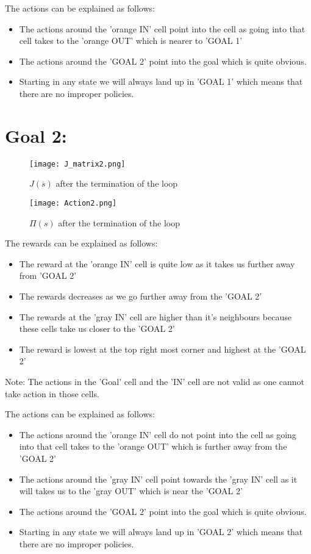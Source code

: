 \documentclass{article}
\begin{document}
The actions can be explained as follows:
\begin{itemize}
\item The actions around the 'orange IN' cell point into the cell as going into that cell takes to the 'orange OUT' which is nearer to 'GOAL 1' 
\item The actions around the 'GOAL 2' point into the goal which is quite obvious.
\item Starting in any state we will always land up in 'GOAL 1' which means that there are no improper policies.
\end{itemize}



\section{Goal 2:}
 
 \begin{figure}[h]
 \centering
\texttt{[image: J\_matrix2.png]}
\caption{$J(s)$ after the termination of the loop}
\end{figure}

\begin{figure}[h]
 \centering
\texttt{[image: Action2.png]}
\caption{$\Pi(s)$ after the termination of the loop}
\end{figure}

The rewards can be explained as follows:
\begin{itemize}
\item The reward at the 'orange IN' cell is quite low as it takes us further away from 'GOAL 2'
\item The rewards decreases as we go further away from the 'GOAL 2'
\item The rewards at the 'gray IN' cell are higher than it's neighbours because these cells take us closer to the 'GOAL 2'
\item The reward is lowest at the top right most corner and highest at the 'GOAL 2'
\end{itemize}
Note: The actions in the 'Goal' cell and the 'IN' cell are not valid as one cannot take action in those cells.

The actions can be explained as follows:
\begin{itemize}
\item The actions around the 'orange IN' cell do not point into the cell as going into that cell takes to the 'orange OUT' which is further away from the 'GOAL 2' 
\item The actions around the 'gray IN' cell point towards the 'gray IN' cell as it will takes us to the 'gray OUT' which is near the 'GOAL 2'
\item The actions around the 'GOAL 2' point into the goal which is quite obvious.
\item Starting in any state we will always land up in 'GOAL 2' which means that there are no improper policies.
\end{itemize}
\end{document}
